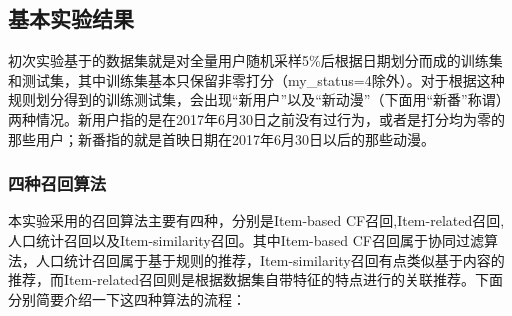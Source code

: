 \documentclass{article}
\begin{document}
	\subsection{基本实验结果}
	初次实验基于的数据集就是对全量用户随机采样5\%后根据日期划分而成的训练集和测试集，其中训练集基本只保留非零打分（my\_status=4除外）。对于根据这种规则划分得到的训练测试集，会出现“新用户”以及“新动漫”（下面用“新番”称谓）两种情况。新用户指的是在2017年6月30日之前没有过行为，或者是打分均为零的那些用户；新番指的就是首映日期在2017年6月30日以后的那些动漫。 
		\subsubsection{四种召回算法}
		本实验采用的召回算法主要有四种，分别是Item-based CF召回,Item-related召回, 人口统计召回以及Item-similarity召回。其中Item-based CF召回属于协同过滤算法，人口统计召回属于基于规则的推荐，Item-similarity召回有点类似基于内容的推荐，而Item-related召回则是根据数据集自带特征的特点进行的关联推荐。下面分别简要介绍一下这四种算法的流程：
\end{document}
